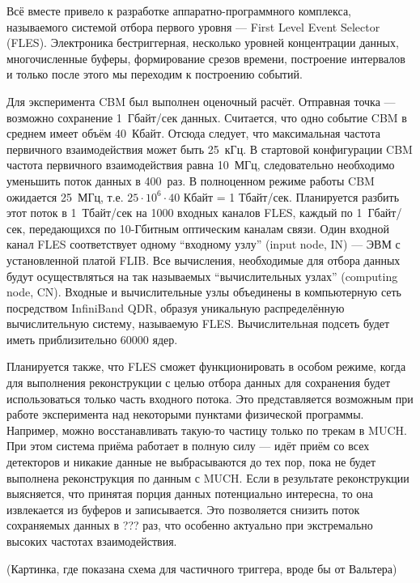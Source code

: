 Всё вместе привело к разработке аппаратно-программного комплекса, называемого системой отбора первого уровня --- First Level Event Selector (FLES).
Электроника бестриггерная, несколько уровней концентрации данных, многочисленные буферы, формирование срезов времени, построение интервалов и только после этого мы переходим к построению событий.

Для эксперимента CBM был выполнен оценочный расчёт. Отправная точка --- возможно сохранение 1~Гбайт/сек данных. Считается, что одно событие CBM в среднем имеет объём 40~Кбайт. Отсюда следует, что максимальная частота первичного взаимодействия может быть 25~кГц. В стартовой конфигурации CBM частота первичного взаимодействия равна 10~МГц, следовательно необходимо уменьшить поток данных в 400~раз. В полноценном режиме работы CBM ожидается 25~МГц, т.е. $ 25 \cdot 10^{6} \cdot 40 $ Кбайт = 1 Тбайт/сек. Планируется разбить этот поток в 1~Тбайт/сек на 1000 входных каналов FLES, каждый по 1~Гбайт/сек, передающихся по 10-Гбитным оптическим каналам связи. Один входной канал FLES соответствует одному ``входному узлу'' (input node, IN) --- ЭВМ с установленной платой FLIB. Все вычисления, необходимые для отбора данных будут осуществляться на так называемых ``вычислительных узлах'' (computing node, CN). Входные и вычислительные узлы объединены в компьютерную сеть посредством InfiniBand QDR, образуя уникальную распределённую вычислительную систему, называемую FLES. Вычислительная подсеть будет иметь приблизительно 60000 ядер.

Планируется также, что FLES сможет функционировать в особом режиме, когда для выполнения реконструкции с целью отбора данных для сохранения будет использоваться только часть входного потока. Это представляется возможным при работе эксперимента над некоторыми пунктами физической программы. Например, можно восстанавливать такую-то частицу только по трекам в MUCH. При этом система приёма работает в полную силу --- идёт приём со всех детекторов и никакие данные не выбрасываются до тех пор, пока не будет выполнена реконструкция по данным с MUCH. Если в результате реконструкции выясняется, что  принятая порция данных потенциально интересна, то она извлекается из буферов и записывается. Это позволяется снизить поток сохраняемых данных в ??? раз, что особенно актуально при экстремально высоких частотах взаимодействия.

(Картинка, где показана схема для частичного триггера, вроде бы от Вальтера)
